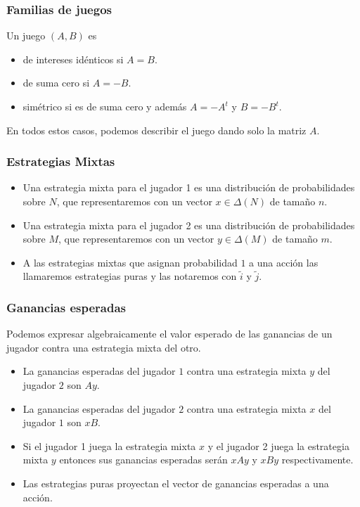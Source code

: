 \documentclass[handout, pdf]{beamer}
\newcommand{\pstrat}{\widetilde}
\begin{document}
\begin{frame}
    \frametitle{Familias de juegos}
    Un juego $(A, B)$ es  
        \begin{itemize}
        \item de intereses idénticos  si $A = B$.
        \item de suma cero si $A = -B$.
        \item simétrico si es de suma cero y además $A = -A^t$ y $B = -B^t$. 
        \end{itemize}
    En todos estos casos, podemos describir el juego dando solo la matriz $A$.
\end{frame}

\begin{frame}
    \frametitle{Estrategias Mixtas}
    \begin{itemize}
        \item Una estrategia mixta para el jugador 1 es una distribución de probabilidades sobre $N$, que representaremos con un vector $x \in \Delta(N)$ de tamaño $n$.
        \pause
        \item Una estrategia mixta para el jugador 2 es una distribución de probabilidades sobre $M$, que representaremos con un vector $y \in \Delta(M)$ de tamaño $m$.
        \pause
        \item A las estrategias mixtas que asignan probabilidad $1$ a una acción las llamaremos estrategias puras y las notaremos con $\pstrat{i}$ y $\pstrat{j}$.
        \end{itemize}
\end{frame}

\begin{frame}
    \frametitle{Ganancias esperadas}
    Podemos expresar algebraicamente el valor esperado de las ganancias de un jugador contra una estrategia mixta del otro.
    \pause
    \begin{itemize}
        \item La ganancias esperadas del jugador $1$ contra una estrategia mixta $y$ del jugador $2$ son $Ay$.
        \pause
        \item La ganancias esperadas del jugador $2$ contra una estrategia mixta $x$ del jugador $1$ son $xB$.
        \pause
        \item Si el jugador 1 juega la estrategia mixta $x$ y el jugador 2 juega la estrategia mixta $y$ entonces sus ganancias esperadas serán $xAy$ y $xBy$ respectivamente.
        \pause
        \item Las estrategias puras proyectan el vector de ganancias esperadas a una acción. 
    \end{itemize} 
\end{frame}
\end{document}
